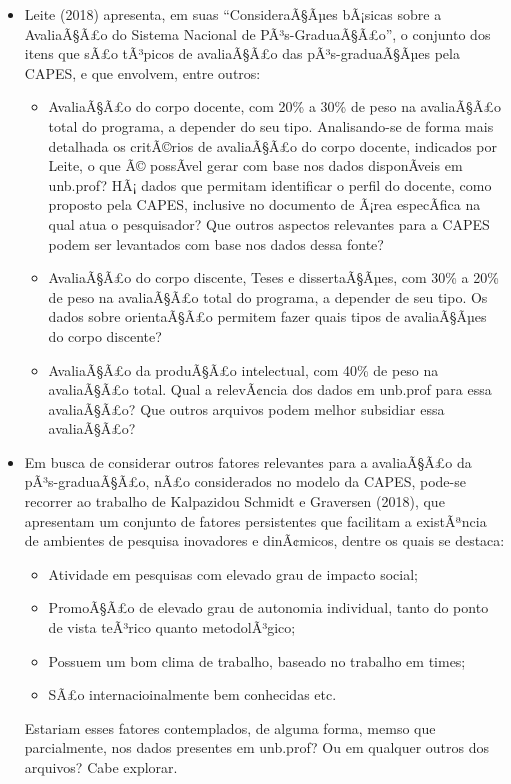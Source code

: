 \documentclass[]{article}
\providecommand{\tightlist}{%
  \setlength{\itemsep}{0pt}\setlength{\parskip}{0pt}}
\begin{document}
\begin{itemize}
\tightlist
\item
  Leite (2018) apresenta, em suas ``ConsideraÃ§Ãµes bÃ¡sicas sobre a
  AvaliaÃ§Ã£o do Sistema Nacional de PÃ³s-GraduaÃ§Ã£o'', o conjunto dos
  itens que sÃ£o tÃ³picos de avaliaÃ§Ã£o das pÃ³s-graduaÃ§Ãµes pela
  CAPES, e que envolvem, entre outros:

  \begin{itemize}
  \tightlist
  \item
    AvaliaÃ§Ã£o do corpo docente, com 20\% a 30\% de peso na avaliaÃ§Ã£o
    total do programa, a depender do seu tipo. Analisando-se de forma
    mais detalhada os critÃ©rios de avaliaÃ§Ã£o do corpo docente,
    indicados por Leite, o que Ã© possÃ­vel gerar com base nos dados
    disponÃ­veis em unb.prof? HÃ¡ dados que permitam identificar o
    perfil do docente, como proposto pela CAPES, inclusive no documento
    de Ã¡rea especÃ­fica na qual atua o pesquisador? Que outros aspectos
    relevantes para a CAPES podem ser levantados com base nos dados
    dessa fonte?
  \item
    AvaliaÃ§Ã£o do corpo discente, Teses e dissertaÃ§Ãµes, com 30\% a
    20\% de peso na avaliaÃ§Ã£o total do programa, a depender de seu
    tipo. Os dados sobre orientaÃ§Ã£o permitem fazer quais tipos de
    avaliaÃ§Ãµes do corpo discente?
  \item
    AvaliaÃ§Ã£o da produÃ§Ã£o intelectual, com 40\% de peso na
    avaliaÃ§Ã£o total. Qual a relevÃ¢ncia dos dados em unb.prof para
    essa avaliaÃ§Ã£o? Que outros arquivos podem melhor subsidiar essa
    avaliaÃ§Ã£o?
  \end{itemize}
\item
  Em busca de considerar outros fatores relevantes para a avaliaÃ§Ã£o da
  pÃ³s-graduaÃ§Ã£o, nÃ£o considerados no modelo da CAPES, pode-se
  recorrer ao trabalho de Kalpazidou Schmidt e Graversen (2018), que
  apresentam um conjunto de fatores persistentes que facilitam a
  existÃªncia de ambientes de pesquisa inovadores e dinÃ¢micos, dentre
  os quais se destaca:

  \begin{itemize}
  \tightlist
  \item
    Atividade em pesquisas com elevado grau de impacto social;
  \item
    PromoÃ§Ã£o de elevado grau de autonomia individual, tanto do ponto
    de vista teÃ³rico quanto metodolÃ³gico;
  \item
    Possuem um bom clima de trabalho, baseado no trabalho em times;
  \item
    SÃ£o internacioinalmente bem conhecidas etc.
  \end{itemize}

  Estariam esses fatores contemplados, de alguma forma, memso que
  parcialmente, nos dados presentes em unb.prof? Ou em qualquer outros
  dos arquivos? Cabe explorar.
\end{itemize}
\end{document}
